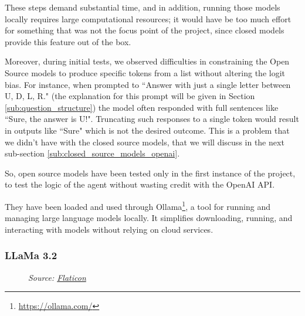 These steps demand substantial time, and in addition, running those models
locally requires large computational resources; it would have be too much effort
for something that was not the focus point of the project, since closed models
provide this feature out of the box.

Moreover, during initial tests, we observed difficulties in constraining the
Open Source models to produce specific tokens from a list without altering the
logit bias. For instance, when prompted to ``Answer with just a single letter
between U, D, L, R." (the explanation for this prompt will be given in Section
\ref{sub:question_structure}) the model often responded with full sentences like
``Sure, the answer is U!". Truncating such responses to a single token would result
in outputs like ``Sure" which is not the desired outcome. This is a problem that
we didn't have with the closed source models, that we will discuss in the next
sub-section \ref{sub:closed_source_models_openai}.

So, open source models have been tested only in the first instance of the project,
to test the logic of the agent without wasting credit with the OpenAI API.

They have been loaded and used through Ollama\footnote{\url{https://ollama.com/}},
a tool for running and managing large language models locally. It simplifies downloading,
running, and interacting with models without relying on cloud services.

\subsubsection{LLaMa 3.2}

\begin{figure}
  \centering
  \def\stackalignment{l}
  {\scriptsize \parbox[t]{\linewidth}{\emph{Source: \href{https://www.flaticon.com/free-icon/meta_6033716}{Flaticon}}}}
\end{figure}

